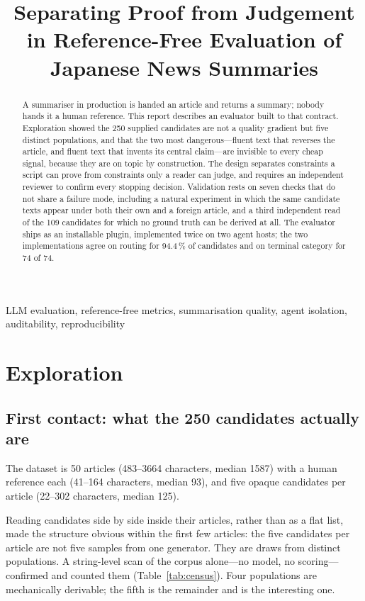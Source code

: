 \documentclass[conference]{IEEEtran}
\title{Separating Proof from Judgement in Reference-Free Evaluation of Japanese News Summaries}
\author{\IEEEauthorblockN{Chen Jinhua}
\IEEEauthorblockA{AI Quality Scientist Take-Home Assignment\\
50 XL-Sum Japanese articles, 250 candidate summaries}}
\begin{document}
\maketitle

\begin{abstract}
A summariser in production is handed an article and returns a summary; nobody hands it a human reference. This report describes an evaluator built to that contract. Exploration showed the 250 supplied candidates are not a quality gradient but five distinct populations, and that the two most dangerous---fluent text that reverses the article, and fluent text that invents its central claim---are invisible to every cheap signal, because they are on topic by construction. The design separates constraints a script can prove from constraints only a reader can judge, and requires an independent reviewer to confirm every stopping decision. Validation rests on seven checks that do not share a failure mode, including a natural experiment in which the same candidate texts appear under both their own and a foreign article, and a third independent read of the 109 candidates for which no ground truth can be derived at all. The evaluator ships as an installable plugin, implemented twice on two agent hosts; the two implementations agree on routing for 94.4\,\% of candidates and on terminal category for 74 of 74.
\end{abstract}

\begin{IEEEkeywords}
LLM evaluation, reference-free metrics, summarisation quality, agent isolation, auditability, reproducibility
\end{IEEEkeywords}

\section{Exploration}

\subsection{First contact: what the 250 candidates actually are}
The dataset is 50 articles (483--3664 characters, median 1587) with a
human reference each (41--164 characters, median 93), and five opaque
candidates per article (22--302 characters, median 125).

Reading candidates side by side inside their articles, rather than as a
flat list, made the structure obvious within the first few articles: the
five candidates per article are not five samples from one generator.
They are draws from distinct populations. A string-level scan
of the corpus alone---no model, no scoring---confirmed and counted them
(Table~\ref{tab:census}). Four populations are mechanically derivable;
the fifth is the remainder and is the interesting one.
\end{document}
